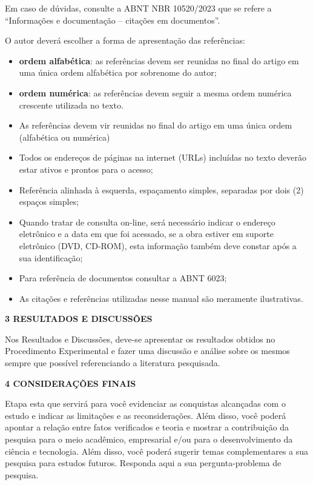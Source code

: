 \documentclass[
]{article}
\begin{document}
Em caso de dúvidas, consulte a ABNT NBR 10520/2023 que se refere a
``Informações e documentação -- citações em documentos''.

O autor deverá escolher a forma de apresentação das referências:

\begin{itemize}
\item
  \textbf{ordem alfabética}: as referências devem ser reunidas no final
  do artigo em uma única ordem alfabética por sobrenome do autor;
\item
  \textbf{ordem numérica}: as referências devem seguir a mesma ordem
  numérica crescente utilizada no texto.
\end{itemize}

\begin{itemize}
\item
  As referências devem vir reunidas no final do artigo em uma única
  ordem (alfabética ou numérica)
\item
  Todos os endereços de páginas na internet (URLs) incluídas no texto
  deverão estar ativos e prontos para o acesso;
\item
  Referência alinhada à esquerda, espaçamento simples, separadas por
  dois (2) espaços simples;
\item
  Quando tratar de consulta on-line, será necessário indicar o endereço
  eletrônico e a data em que foi acessado, se a obra estiver em suporte
  eletrônico (DVD, CD-ROM), esta informação também deve constar após a
  sua identificação;
\item
  Para referência de documentos consultar a ABNT 6023;
\item
  As citações e referências utilizadas nesse manual são meramente
  ilustrativas.
\end{itemize}

\textbf{3 RESULTADOS E DISCUSSÕES}

Nos Resultados e Discussões, deve-se apresentar os resultados obtidos no
Procedimento Experimental e fazer uma discussão e análise sobre os
mesmos sempre que possível referenciando a literatura pesquisada.

\textbf{4 CONSIDERAÇÕES FINAIS}

Etapa esta que servirá para você evidenciar as conquistas alcançadas com
o estudo e indicar as limitações e as reconsiderações. Além disso, você
poderá apontar a relação entre fatos verificados e teoria e mostrar a
contribuição da pesquisa para o meio acadêmico, empresarial e/ou para o
desenvolvimento da ciência e tecnologia. Além disso, você poderá sugerir
temas complementares a sua pesquisa para estudos futuros. Responda aqui
a sua pergunta-problema de pesquisa.
\end{document}
